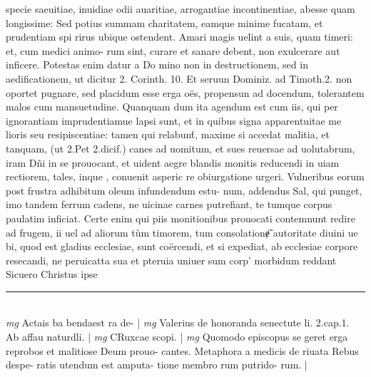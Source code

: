 \documentclass{article}
\begin{document}
\begin{pages}
specie saeuitiae, inuidiae odii auaritiae, arrogantiae incontinentiae, abesse quam longissime: Sed potius summam charitatem, eamque minime fucatam, et prudentiam spi rirus ubique ostendent. Amari magis uelint a suis, quam timeri: et, cum medici animo- rum sint, curare et sanare debent, non exulcerare aut inficere. Potestas enim datur a Do mino non in destructionem, sed in aedificationem, ut dicitur 2. Corinth. 10. Et seruun Dominiz. ad Timoth.2. non oportet pugnare, sed placidum esse erga oës, propensun ad docendum, tolerantem malos cum mansuetudine. Quanquam dum ita agendum est cum iis, qui per ignorantiam imprudentiamue lapsi sunt, et in quibus signa apparentuitae me lioris seu resipiscentiae: tamen qui relabunt́, maxime si accedat malitia, et tanquam, (ut 2.Pet 2.dicif.) canes ad uomitum, et sues reuersae ad uolutabrum, iram Dñi in se prouocant, et uident aegre blandis monitis reducendi in uiam rectiorem, tales, inque , conuenit asperic re obiurgatione urgeri. Vulneribus eorum post frustra adhibitum oleum infundendum estu- num, addendus Sal, qui punget, imo tandem ferrum cadens, ne uicinae carnes putrefiant, te tumque corpus paulatim inficiat. Certe enim qui piis monitionibus prouocati contemnunt redire ad frugem, ii uel ad aliorum tùm timorem, tum consolationɇ̃ autoritate diuini ue bi, quod est gladius ecclesiae, sunt coërcendi, et si expediat, ab ecclesiae corpore resecandi, ne peruicatta sua et pteruia uniuer sum corp' morbidum reddant Sicuero Christus ipse  \pend
\vspace{0.5cm}\noindent
\vspace{0.2cm}\rule{1cm}{0.2pt}\\ 
\hspace{0.2cm}\textit{mg}
\footnotesize Actais ba bendaest ra de- 
\normalsize| 
\hspace{0.2cm}\textit{mg}
\footnotesize Valerius de honoranda senectute li. 2.cap.1. Ab affau naturdli. 
\normalsize| 
\hspace{0.2cm}\textit{mg}
\footnotesize CRuxcae scopi. 
\normalsize| 
\hspace{0.2cm}\textit{mg}
\footnotesize Quomodo episcopus se geret erga reprobos et malitiose Deum prouo- cantes. Metaphora a medicis de riuata Rebus despe- ratis utendum est amputa- tione membro rum putrido- rum. 
\normalsize| 

\end{pages}
\end{document}
